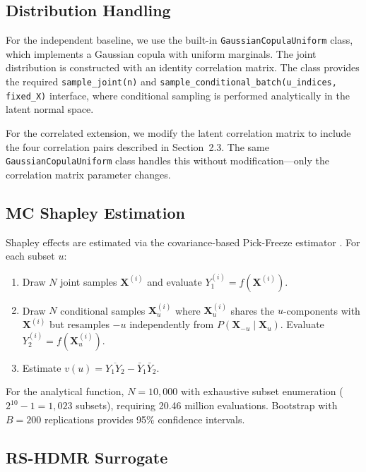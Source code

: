 \documentclass[11pt,a4paper]{article}
\begin{document}
\subsection{Distribution Handling}

For the independent baseline, we use the built-in \texttt{GaussianCopulaUniform} class, which implements a Gaussian copula with uniform marginals. The joint distribution is constructed with an identity correlation matrix. The class provides the required \texttt{sample\_joint(n)} and \texttt{sample\_conditional\_batch(u\_indices, fixed\_X)} interface, where conditional sampling is performed analytically in the latent normal space.

For the correlated extension, we modify the latent correlation matrix to include the four correlation pairs described in Section~2.3. The same \texttt{GaussianCopulaUniform} class handles this without modification---only the correlation matrix parameter changes.

\subsection{MC Shapley Estimation}

Shapley effects are estimated via the covariance-based Pick-Freeze estimator \cite{OwenPrieur2017}. For each subset $u$:

\begin{enumerate}[nosep]
    \item Draw $N$ joint samples $\mathbf{X}^{(i)}$ and evaluate $Y_1^{(i)} = f(\mathbf{X}^{(i)})$.
    \item Draw $N$ conditional samples $\mathbf{X}_u^{(i)}$ where $\mathbf{X}_u^{(i)}$ shares the $u$-components with $\mathbf{X}^{(i)}$ but resamples $-u$ independently from $P(\mathbf{X}_{-u} \mid \mathbf{X}_u)$. Evaluate $Y_2^{(i)} = f(\mathbf{X}_u^{(i)})$.
    \item Estimate $v(u) = \overline{Y_1 Y_2} - \bar{Y}_1 \bar{Y}_2$.
\end{enumerate}

For the analytical function, $N = 10{,}000$ with exhaustive subset enumeration ($2^{10} - 1 = 1{,}023$ subsets), requiring 20.46 million evaluations. Bootstrap with $B = 200$ replications provides 95\% confidence intervals.

\subsection{RS-HDMR Surrogate}
\end{document}
